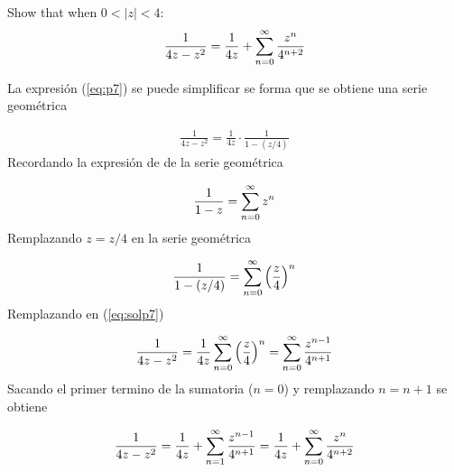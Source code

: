 \begin{problem}{7}
    Show that when $0 < |z| < 4$:
    \begin{gather}
        \label{eq:p7}\frac{1}{4z - z^2} = \frac{1}{4z} + \sum_{n = 0}^{\infty} \frac{z^n}{4^{n+2}}
    \end{gather}
\end{problem}
La expresión (\ref*{eq:p7}) se puede simplificar se forma que se obtiene una serie geométrica

\begin{gather}
    \label{eq:solp7}\frac{1}{4z - z^2} = \frac{1}{4z}\cdot \frac{1}{1- (z/4)}
\end{gather}
Recordando la expresión de de la serie geométrica 

\begin{gather*}
    \frac{1}{1-z} = \sum_{n = 0}^{\infty} z^n
\end{gather*}
Remplazando $z = z/4$ en la serie geométrica 

\begin{gather*}
    \frac{1}{1-(z/4)} = \sum_{n = 0}^{\infty} \left(\frac{z}{4}\right)^n
\end{gather*}
Remplazando en (\ref*{eq:solp7})

\begin{gather*}
    \frac{1}{4z - z^2} = \frac{1}{4z} \sum_{n = 0}^{\infty} \left(\frac{z}{4}\right)^n = \sum_{n = 0}^{\infty} \frac{z^{n-1}}{4^{n+1}}
\end{gather*}
Sacando el primer termino de la sumatoria ($n = 0$) y remplazando $n = n+1$ se obtiene 

\begin{mdframed}
    \vspace{-0.5cm}
    \begin{gather}
        \frac{1}{4z - z^2} = \frac{1}{4z} + \sum_{n = 1}^{\infty} \frac{z^{n-1}}{4^{n+1}} = \frac{1}{4z} + \sum_{n = 0}^{\infty} \frac{z^{n}}{4^{n+2}} 
    \end{gather}
\end{mdframed}